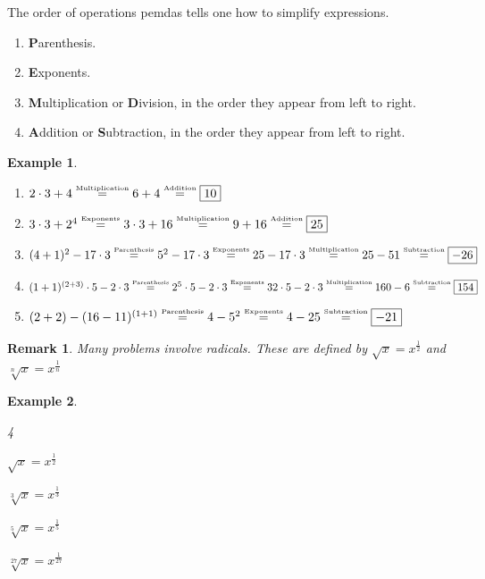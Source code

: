 \documentclass[oneside]{book}
\theoremstyle{mystyle}
\newtheorem{example}{Example}[section]
\newtheorem{remark}{Remark}[section]
\begin{document}
The order of operations \gls{pemdas} tells one how to simplify expressions.
\begin{enumerate}[itemsep=0pt]
\label{North_Shore_PEMDAS}
    \item \textbf{P}arenthesis.
    \item \textbf{E}xponents.
    \item \textbf{M}ultiplication or \textbf{D}ivision, in the order they appear from left to right.
    \item \textbf{A}ddition or \textbf{S}ubtraction, in the order they appear from left to right.
\end{enumerate}
\begin{example}
\
\begin{enumerate}[itemsep=0pt]
\item $2\cdot 3+4 \overset{\textrm{\tiny{Multiplication}}}{=} 6+4\overset{\textrm{\tiny{Addition}}}{=}\boxed{10}$
\item $3\cdot 3 + 2^4 \overset{\textrm{\tiny{Exponents}}}{=} 3\cdot 3 + 16 \overset{\textrm{\tiny{Multiplication}}}{=} 9+16 \overset{\textrm{\tiny{Addition}}}{=} \boxed{25}$
\item $(4+1)^2-17\cdot 3\overset{\textrm{\tiny{Parenthesis}}}{=}5^{2}-17\cdot 3\overset{\textrm{\tiny{Exponents}}}{=}25-17\cdot 3 \overset{\textrm{\tiny{Multiplication}}}{=} 25-51 \overset{\textrm{\tiny{Subtraction}}}{=}\boxed{-26}$
\item $(1+1)^{(2+3)}\cdot 5-2\cdot 3\overset{\textrm{\tiny{Parenthesis}}}{=}2^{5}\cdot 5-2\cdot 3\overset{\textrm{\tiny{Exponents}}}{=}32\cdot 5-2\cdot 3\overset{\textrm{\tiny{Multiplication}}}{=} 160-6\overset{\textrm{\tiny{Subtraction}}}{=}\boxed{154}$
\item $(2+2)-(16-11)^{(1+1)}\overset{\textrm{\tiny{Parenthesis}}}{=}4-5^{2}\overset{\textrm{\tiny{Exponents}}}{=}4-25\overset{\textrm{\tiny{Subtraction}}}{=}\boxed{-21}$
\end{enumerate}
\end{example}
\begin{remark}
\label{remark:North_Shore_Radicals_Def} Many problems involve radicals. These are defined by $\sqrt{x}=x^{\frac{1}{2}}$ and $\sqrt[n]{x}=x^{\frac{1}{n}}$
\end{remark}
\clearpage
\begin{example}
\
\begin{enumerate}
\end{enumerate}
\end{example}
\end{document}
